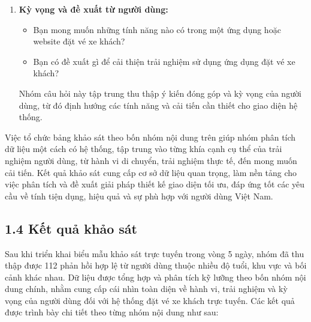 \begin{enumerate}
    \item \textbf{Kỳ vọng và đề xuất từ người dùng:}
    \begin{itemize}
        \item Bạn mong muốn những tính năng nào có trong một ứng dụng hoặc website đặt vé xe khách?
        \item Bạn có đề xuất gì để cải thiện trải nghiệm sử dụng ứng dụng đặt vé xe khách?
    \end{itemize}
    Nhóm câu hỏi này tập trung thu thập ý kiến đóng góp và kỳ vọng của người dùng, từ đó định hướng các tính năng và cải tiến cần thiết cho giao diện hệ thống.
\end{enumerate}

Việc tổ chức bảng khảo sát theo bốn nhóm nội dung trên giúp nhóm phân tích dữ liệu một cách có hệ thống, tập trung vào từng khía cạnh cụ thể của trải nghiệm người dùng, từ hành vi di chuyển, trải nghiệm thực tế, đến mong muốn cải tiến. Kết quả khảo sát cung cấp cơ sở dữ liệu quan trọng, làm nền tảng cho việc phân tích và đề xuất giải pháp thiết kế giao diện tối ưu, đáp ứng tốt các yêu cầu về tính tiện dụng, hiệu quả và sự phù hợp với người dùng Việt Nam.

\subsection*{1.4 Kết quả khảo sát}
Sau khi triển khai biểu mẫu khảo sát trực tuyến trong vòng 5 ngày, nhóm đã thu thập được 112 phản hồi hợp lệ từ người dùng thuộc nhiều độ tuổi, khu vực và bối cảnh khác nhau. Dữ liệu được tổng hợp và phân tích kỹ lưỡng theo bốn nhóm nội dung chính, nhằm cung cấp cái nhìn toàn diện về hành vi, trải nghiệm và kỳ vọng của người dùng đối với hệ thống đặt vé xe khách trực tuyến. Các kết quả được trình bày chi tiết theo từng nhóm nội dung như sau:


